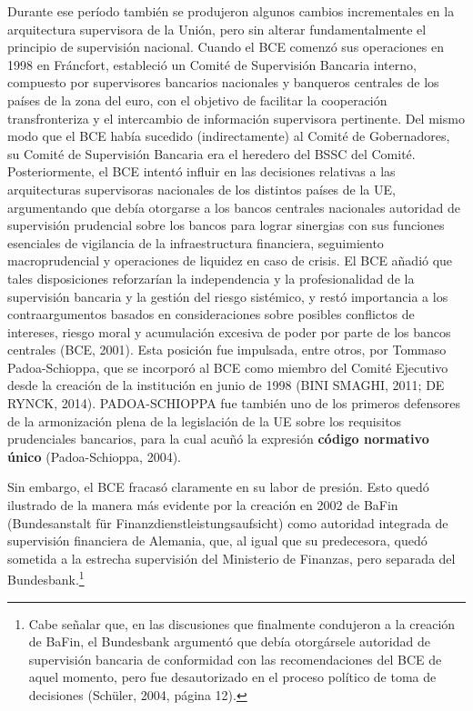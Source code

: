 \documentclass[10pt,a4paper]{article}
\begin{document}
{Durante ese período también se produjeron algunos cambios incrementales en la arquitectura supervisora de la Unión, pero sin alterar fundamentalmente el principio de supervisión nacional. Cuando el BCE comenzó sus operaciones en 1998 en Fráncfort, estableció un Comité de Supervisión Bancaria interno, compuesto por supervisores bancarios nacionales y banqueros centrales de los países de la zona del euro, con el objetivo de facilitar la cooperación transfronteriza y el intercambio de información supervisora pertinente. Del mismo modo que el BCE había sucedido (indirectamente) al Comité de Gobernadores, su Comité de Supervisión Bancaria era el heredero del BSSC del Comité. Posteriormente, el BCE intentó influir en las decisiones relativas a las arquitecturas supervisoras nacionales de los distintos países de la UE, argumentando que debía otorgarse a los bancos centrales nacionales autoridad de supervisión prudencial sobre los bancos para lograr sinergias con sus funciones esenciales de vigilancia de la infraestructura financiera, seguimiento macroprudencial y operaciones de liquidez en caso de crisis. El BCE añadió que tales disposiciones reforzarían la independencia y la profesionalidad de la supervisión bancaria y la gestión del riesgo sistémico, y restó importancia a los contraargumentos basados en consideraciones sobre posibles conflictos de intereses, riesgo moral y acumulación excesiva de poder por parte de los bancos centrales (BCE, 2001). Esta posición fue impulsada, entre otros, por Tommaso Padoa-Schioppa, que se incorporó al BCE como miembro del Comité Ejecutivo desde la creación de la institución en junio de 1998 (BINI SMAGHI, 2011; DE RYNCK, 2014). PADOA-SCHIOPPA fue también uno de los primeros defensores de la armonización plena de la legislación de la UE sobre los requisitos prudenciales bancarios, para la cual acuñó la expresión \textbf{código normativo único} (Padoa-Schioppa, 2004).

Sin embargo, el BCE fracasó claramente en su labor de presión. Esto quedó ilustrado de la manera más evidente por la creación en 2002 de BaFin (Bundesanstalt für Finanzdienstleistungsaufsicht) como autoridad integrada de supervisión financiera de Alemania, que, al igual que su predecesora, quedó sometida a la estrecha supervisión del Ministerio de Finanzas, pero separada del Bundesbank.\footnote{%
    Cabe señalar que, en las discusiones que finalmente condujeron a la creación de BaFin, el Bundesbank argumentó que debía otorgársele autoridad de supervisión bancaria de conformidad con las recomendaciones del BCE de aquel momento, pero fue desautorizado en el proceso político de toma de decisiones (Schüler, 2004, página 12).
}

}
\end{document}
